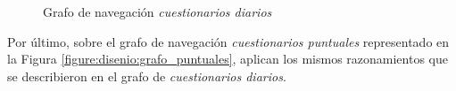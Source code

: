 \begin{figure}[h]
                \caption{Grafo de navegación \textit{cuestionarios diarios}}
                \label{figure:disenio:grafo_diario}
            \end{figure}

            Por último, sobre el grafo de navegación \textit{cuestionarios puntuales} representado en la Figura \ref{figure:disenio:grafo_puntuales}, aplican los mismos razonamientos que se describieron en el grafo de \textit{cuestionarios diarios}.
            
